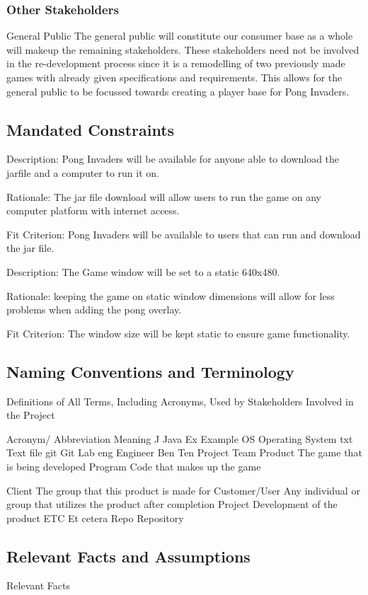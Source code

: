 \documentclass[12pt, titlepage]{article}
\begin{document}
\subsubsection{Other Stakeholders}
General Public
The general public will constitute our consumer base as a whole will makeup the
remaining stakeholders. These stakeholders need not be involved in the
re-development process since it is a remodelling of two previously made games
with already given specifications and requirements. This allows for the general
public to be focussed towards creating a player base for Pong Invaders.
\subsection{Mandated Constraints}
Description: Pong Invaders will be available for anyone able to download the
jarfile and a computer to run it on.
 
Rationale: The jar file download will allow users to run the game on any
computer platform with internet access.
 
Fit Criterion: Pong Invaders will be available to users that can run and
download the jar file.
 

Description: The Game window will be set to a static 640x480.
 
Rationale: keeping the game on static window dimensions will allow for less
problems when adding the pong overlay.
 
Fit Criterion: The window size will be kept static to ensure game
functionality.\subsection{Naming Conventions and Terminology}

Definitions of All Terms, Including Acronyms, Used by Stakeholders Involved in
the Project

Acronym/ Abbreviation
Meaning
J
Java
Ex
Example
OS
Operating System
txt
Text file
git
Git Lab
eng
Engineer
Ben Ten
Project Team
Product
The game that is being developed
Program
Code that makes up the game

Client
The group that this product is made for
Customer/User
Any individual or group that utilizes the product after completion
Project
Development of the product
ETC
Et cetera
Repo
Repository

\subsection{Relevant Facts and Assumptions}
Relevant Facts
\end{document}
